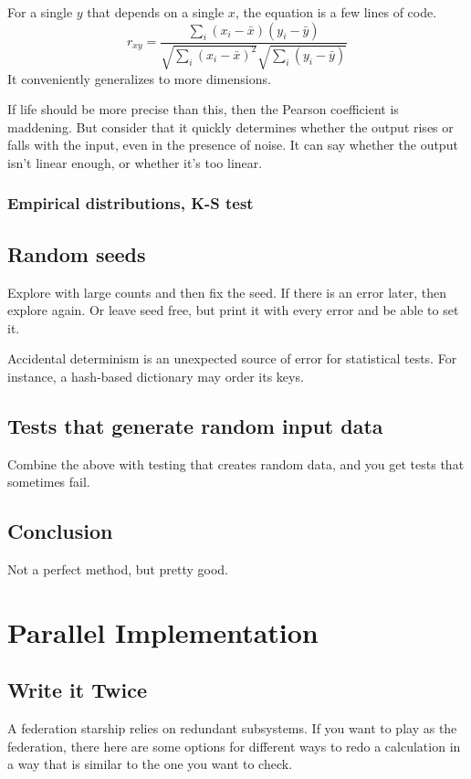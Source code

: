 \documentclass[fleqn,10pt]{olplainarticle}
\begin{document}
For a single $y$ that depends on a single $x$, the equation
is a few lines of code.
\begin{equation}
r_{xy} = \frac{\sum_i (x_i - \bar{x})(y_i - \bar{y})}{\sqrt{\sum_i (x_i - \bar{x})^2}\sqrt{\sum_i(y_i - \bar{y})}}
\end{equation}
It conveniently generalizes to more dimensions.

If life should be more precise than this, then the Pearson
coefficient is maddening. But consider that it quickly
determines whether the output rises or falls with the input,
even in the presence of noise. It can say whether the output
isn't linear enough, or whether it's too linear.

\subsubsection{Empirical distributions, K-S test}

\subsection{Random seeds}

Explore with large counts and then fix the seed. If there is an error later,
then explore again. Or leave seed free, but print it with every error
and be able to set it.

Accidental determinism is an unexpected source of error for
statistical tests. For instance, a hash-based dictionary may
order its keys.

\subsection{Tests that generate random input data}

Combine the above with testing that creates random data,
and you get tests that sometimes fail.

\subsection{Conclusion}
Not a perfect method, but pretty good.



\section{Parallel Implementation}\label{sec:parallel-implementation}
\subsection{Write it Twice}
A federation starship relies on redundant subsystems. If you want to play
as the federation, there here are some options for different ways to
redo a calculation in a way that is similar to the one you want to check.
\end{document}
